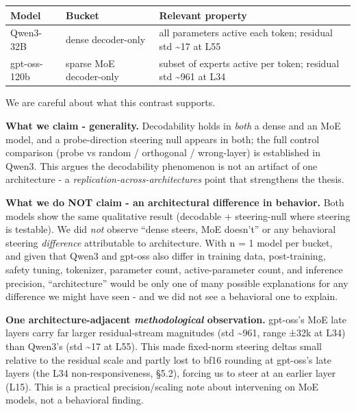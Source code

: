 \documentclass[
]{article}
\newcounter{none} %
\begin{document}
{\def\LTcaptype{none} %
\begin{longtable}[]{@{}
  >{\raggedright\arraybackslash}p{}
  >{\raggedright\arraybackslash}p{}
  >{\raggedright\arraybackslash}p{}@{}}
\toprule\noalign{}
\begin{minipage}[b]{\linewidth}\raggedright
Model
\end{minipage} & \begin{minipage}[b]{\linewidth}\raggedright
Bucket
\end{minipage} & \begin{minipage}[b]{\linewidth}\raggedright
Relevant property
\end{minipage} \\
\midrule\noalign{}
\endhead
\bottomrule\noalign{}
\endlastfoot
Qwen3-32B & dense decoder-only & all parameters active each token;
residual std \textasciitilde17 at L55 \\
gpt-oss-120b & sparse MoE decoder-only & subset of experts active per
token; residual std \textasciitilde961 at L34 \\
\end{longtable}
}

We are careful about what this contrast supports.

\textbf{What we claim - generality.} Decodability holds in \emph{both} a
dense and an MoE model, and a probe-direction steering null appears in
both; the full control comparison (probe vs random / orthogonal /
wrong-layer) is established in Qwen3. This argues the decodability
phenomenon is not an artifact of one architecture - a
\emph{replication-across-architectures} point that strengthens the
thesis.

\textbf{What we do NOT claim - an architectural difference in behavior.}
Both models show the same qualitative result (decodable + steering-null
where steering is testable). We did \emph{not} observe ``dense steers,
MoE doesn't'' or any behavioral steering \emph{difference} attributable
to architecture. With n = 1 model per bucket, and given that Qwen3 and
gpt-oss also differ in training data, post-training, safety tuning,
tokenizer, parameter count, active-parameter count, and inference
precision, ``architecture'' would be only one of many possible
explanations for any difference we might have seen - and we did not see
a behavioral one to explain.

\textbf{One architecture-adjacent \emph{methodological} observation.}
gpt-oss's MoE late layers carry far larger residual-stream magnitudes
(std \textasciitilde961, range ±32k at L34) than Qwen3's (std
\textasciitilde17 at L55). This made fixed-norm steering deltas small
relative to the residual scale and partly lost to bf16 rounding at
gpt-oss's late layers (the L34 non-responsiveness, §5.2), forcing us to
steer at an earlier layer (L15). This is a practical precision/scaling
note about intervening on MoE models, not a behavioral finding.
\end{document}
